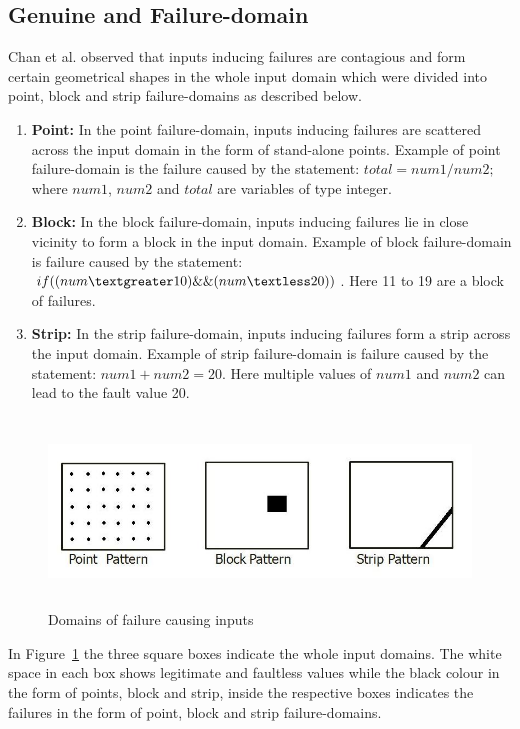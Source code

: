 \subsection{Genuine and Failure-domain}
\label{sec:genuineandfailuredomain}
Chan et al. \cite{chan1996proportional} observed that inputs inducing failures are contagious and form certain geometrical shapes in the whole input domain which were divided into point, block and strip failure-domains as described below.

\begin{enumerate}
\item {\bf Point:} In the point failure-domain, inputs inducing failures are scattered across the input domain in the form of stand-alone points. Example of point failure-domain is the failure caused by the statement: $total = num1/num2;$ where $num1$, $num2$ and $total$ are variables of type integer.
\item {\bf Block:} In the block failure-domain, inputs inducing failures lie in close vicinity to form a block in the input domain. Example of block failure-domain is failure caused by the statement: $if ( (num \textgreater 10) \&\& (num \textless 20) )$. Here 11 to 19 are a block of failures.
\item {\bf Strip:} In the strip failure-domain, inputs inducing failures form a strip across the input domain. Example of strip failure-domain is failure caused by the statement: $num1 + num2 = 20$. Here multiple values of $num1$ and $num2$ can lead to the fault value 20. 
\end{enumerate}



\begin{figure}[h]
	\centering
	\centerline{\includegraphics[width=13cm, height=5cm ]{chapter2/pointblockstrip.jpg}}
	\caption{Domains of failure causing inputs~\cite{chan1996proportional}}
	\label{fig:patterns2}
\end{figure}

In Figure~\ref{fig:patterns2} the three square boxes indicate the whole input domains. The white space in each box shows legitimate and faultless values while the black colour in the form of points, block and strip, inside the respective boxes indicates the failures in the form of point, block and strip failure-domains.


